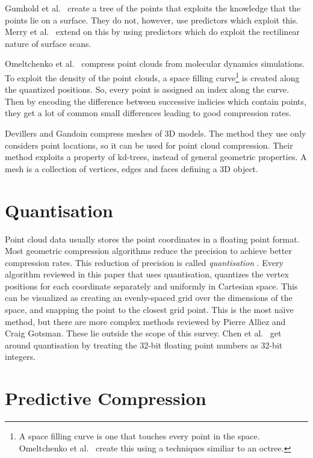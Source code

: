 \documentclass{report}
\begin{document}
Gumhold et al.~\cite{gumholdcomp} create a tree of the points that exploits
the knowledge that the points lie on a surface. They do not, however, use
predictors which exploit this. Merry et al.~\cite{merrycomp} extend on this by
using predictors which do exploit the rectilinear nature of surface scans.

Omeltchenko et al.~\cite{omeltchenko2000sls} compress point clouds from
molecular dynamics simulations. To exploit the density of the point clouds, a
space filling curve\footnote{A space filling curve is one that touches every
  point in the space. Omeltchenko et al.~\cite{omeltchenko2000sls} create this
  using a techniques similiar to an octree.} is created along the quantized
positions. So, every point is assigned an index along the curve. Then by
encoding the difference between successive indicies which contain points, they
get a lot of common small differences leading to good compression rates.

Devillers and Gandoin \cite{devillers2000gci} compress meshes of 3D
models. The method they use only considers point locations, so it can be used
for point cloud compression. Their method exploits a property of kd-trees,
instead of general geometric properties. A mesh is a collection of vertices,
edges and faces defining a 3D object.


\section{Quantisation}

Point cloud data usually stores the point coordinates in a floating point
format. Most geometric compression algorithms reduce the precision to achieve
better compression rates. This reduction of precision is called
\emph{quantisation} \cite{ag-racm-03}. Every algorithm reviewed in this paper
that uses quantisation, quantizes the vertex positions for each coordinate
separately and uniformly in Cartesian space. This can be visualized as
creating an evenly-spaced grid over the dimensions of the space, and snapping
the point to the closest grid point. This is the most na\"{\i}ve method, but
there are more complex methods reviewed by Pierre Alliez and Craig
Gotsman\cite{ag-racm-03}. These lie outside the scope of this survey. Chen et
al.~\cite{chen2005lcp} get around quantisation by treating the 32-bit floating
point numbers as 32-bit integers.


\section{Predictive Compression}
\end{document}
